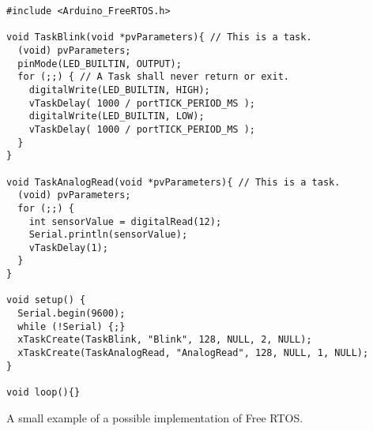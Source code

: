 \begin{listing}[htb!]
  \centering
  \begin{verbatim}
#include <Arduino_FreeRTOS.h>

void TaskBlink(void *pvParameters){ // This is a task.
  (void) pvParameters;
  pinMode(LED_BUILTIN, OUTPUT);
  for (;;) { // A Task shall never return or exit.
    digitalWrite(LED_BUILTIN, HIGH);
    vTaskDelay( 1000 / portTICK_PERIOD_MS );
    digitalWrite(LED_BUILTIN, LOW);
    vTaskDelay( 1000 / portTICK_PERIOD_MS );
  }
}

void TaskAnalogRead(void *pvParameters){ // This is a task.
  (void) pvParameters;
  for (;;) {
    int sensorValue = digitalRead(12);
    Serial.println(sensorValue);
    vTaskDelay(1);
  }
}

void setup() {
  Serial.begin(9600);
  while (!Serial) {;}
  xTaskCreate(TaskBlink, "Blink", 128, NULL, 2, NULL);
  xTaskCreate(TaskAnalogRead, "AnalogRead", 128, NULL, 1, NULL);
}

void loop(){}
\end{verbatim}
  \caption{A small example of a possible implementation of Free RTOS.}
  \label{lst:freeftosexample}
\end{listing}









